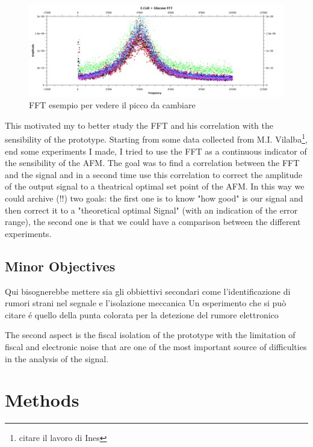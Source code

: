 \documentclass[11pt, a4paper]{article}
\begin{document}
\begin{figure}[h]
\centering
		\includegraphics[width=1\linewidth]{FFT/FFT_dacambiare.jpg}%
\caption{FFT esempio per vedere il picco da cambiare} %
\end{figure}%

This motivated my to better study the FFT and his correlation with the sensibility of the prototype. 
Starting from some data collected from M.I. Vilalba\footnote{citare il lavoro di Ines}, end some experiments I made, I tried to use the FFT as a continuous indicator of the sensibility of the AFM. The goal was to find a correlation between the FFT and the signal and in a second time use this correlation to correct the amplitude of the output signal to a theatrical optimal set point of the AFM. %
In this way we could archive (!!) two goals: the first one is to know "how good" is our signal and then correct it to a "theoretical optimal Signal" (with an indication of the error range), the second one is that we could have a comparison between the different experiments.  %

\subsection{Minor Objectives}%
Qui bisognerebbe mettere sia gli obbiettivi secondari come l'identificazione di rumori strani nel segnale e l'isolazione meccanica
Un esperimento che si può citare é quello della punta colorata per la detezione del rumore elettronico

The second aspect is the fiscal isolation of the prototype with the limitation of fiscal and electronic noise that are one of the most important source of difficulties in the analysis of the signal.
\section{Methods}
\end{document}
